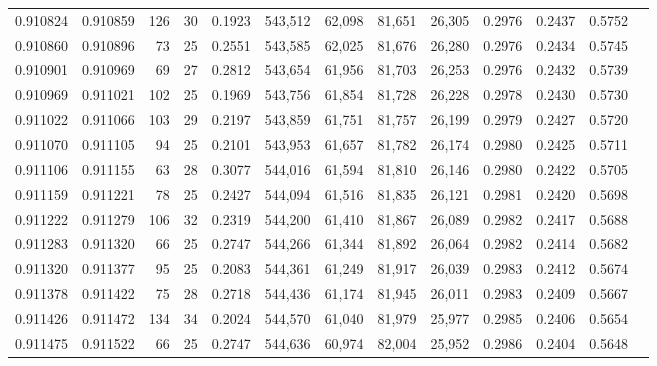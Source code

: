 \begin{tabular}{rrrrrrrrrrrrr}
0.910824 & 0.910859 &   126 &  30 &                                     0.1923 & 543,512 &  62,098 &  81,651 &  26,305 & 0.2976 & 0.2437 & 0.5752 \\
0.910860 & 0.910896 &    73 &  25 &                                     0.2551 & 543,585 &  62,025 &  81,676 &  26,280 & 0.2976 & 0.2434 & 0.5745 \\
0.910901 & 0.910969 &    69 &  27 &                                     0.2812 & 543,654 &  61,956 &  81,703 &  26,253 & 0.2976 & 0.2432 & 0.5739 \\
0.910969 & 0.911021 &   102 &  25 &                                     0.1969 & 543,756 &  61,854 &  81,728 &  26,228 & 0.2978 & 0.2430 & 0.5730 \\
0.911022 & 0.911066 &   103 &  29 &                                     0.2197 & 543,859 &  61,751 &  81,757 &  26,199 & 0.2979 & 0.2427 & 0.5720 \\
0.911070 & 0.911105 &    94 &  25 &                                     0.2101 & 543,953 &  61,657 &  81,782 &  26,174 & 0.2980 & 0.2425 & 0.5711 \\
0.911106 & 0.911155 &    63 &  28 &                                     0.3077 & 544,016 &  61,594 &  81,810 &  26,146 & 0.2980 & 0.2422 & 0.5705 \\
0.911159 & 0.911221 &    78 &  25 &                                     0.2427 & 544,094 &  61,516 &  81,835 &  26,121 & 0.2981 & 0.2420 & 0.5698 \\
0.911222 & 0.911279 &   106 &  32 &                                     0.2319 & 544,200 &  61,410 &  81,867 &  26,089 & 0.2982 & 0.2417 & 0.5688 \\
0.911283 & 0.911320 &    66 &  25 &                                     0.2747 & 544,266 &  61,344 &  81,892 &  26,064 & 0.2982 & 0.2414 & 0.5682 \\
0.911320 & 0.911377 &    95 &  25 &                                     0.2083 & 544,361 &  61,249 &  81,917 &  26,039 & 0.2983 & 0.2412 & 0.5674 \\
0.911378 & 0.911422 &    75 &  28 &                                     0.2718 & 544,436 &  61,174 &  81,945 &  26,011 & 0.2983 & 0.2409 & 0.5667 \\
0.911426 & 0.911472 &   134 &  34 &                                     0.2024 & 544,570 &  61,040 &  81,979 &  25,977 & 0.2985 & 0.2406 & 0.5654 \\
0.911475 & 0.911522 &    66 &  25 &                                     0.2747 & 544,636 &  60,974 &  82,004 &  25,952 & 0.2986 & 0.2404 & 0.5648 \\

\end{tabular}
